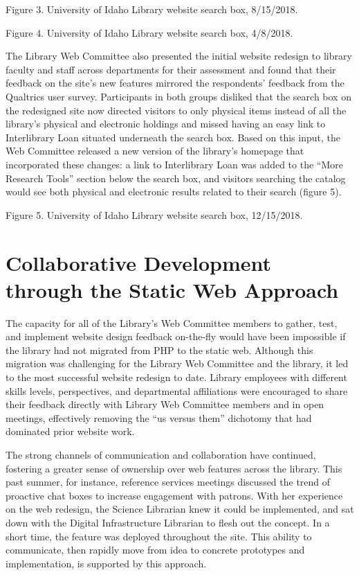\documentclass{book}
\begin{document}
Figure 3. University of Idaho Library website search box, 8/15/2018.

Figure 4. University of Idaho Library website search box, 4/8/2018.

The Library Web Committee also presented the initial website redesign to
library faculty and staff across departments for their assessment and found
that their feedback on the site's new features mirrored the respondents'
feedback from the Qualtrics user survey. Participants in both groups disliked
that the search box on the redesigned site now directed visitors to only
physical items instead of all the library's physical and electronic holdings
and missed having an easy link to Interlibrary Loan situated underneath the
search box. Based on this input, the Web Committee released a new version of
the library's homepage that incorporated these changes: a link to Interlibrary
Loan was added to the ``More Research Tools'' section below the search box,
and visitors searching the catalog would see both physical and electronic
results related to their search (figure 5).

Figure 5. University of Idaho Library website search box, 12/15/2018.

\hypertarget{collaborative-development-through-the-static-web-approach}{%
\section{Collaborative Development through the Static Web
Approach}\label{collaborative-development-through-the-static-web-approach}}

The capacity for all of the Library's Web Committee members to gather, test,
and implement website design feedback on-the-fly would have been impossible if
the library had not migrated from PHP to the static web. Although this
migration was challenging for the Library Web Committee and the library, it
led to the most successful website redesign to date. Library employees with
different skills levels, perspectives, and departmental affiliations were
encouraged to share their feedback directly with Library Web Committee members
and in open meetings, effectively removing the ``us versus them'' dichotomy
that had dominated prior website work.

The strong channels of communication and collaboration have continued,
fostering a greater sense of ownership over web features across the library.
This past summer, for instance, reference services meetings discussed the
trend of proactive chat boxes to increase engagement with patrons. With her
experience on the web redesign, the Science Librarian knew it could be
implemented, and sat down with the Digital Infrastructure Librarian to flesh
out the concept. In a short time, the feature was deployed throughout the
site. This ability to communicate, then rapidly move from idea to concrete
prototypes and implementation, is supported by this approach.
\end{document}
